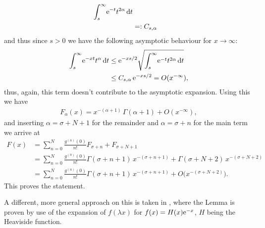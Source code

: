 \begin{Theorem}
\begin{Proof}
\begin{align*}
      \Integ[\infty]{s}{t}{\Eto{-t}t^{2\alpha}} \\
      &=: C_{s,\alpha}
    \end{align*}
    and thus since $s>0$ we have the following asymptotic behaviour for
    $x\to\infty$:
    \begin{align*}
      \Integ[\infty]{s}{t}{\Eto{-xt}t^\alpha} &\le \Eto{-xs/2}
      \sqrt{\Integ[\infty]{s}{t}{\Eto{-t}t^{2\alpha}}} \\
      &\le C_{s,\alpha}\,\Eto{-xs/2} = O(x^{-\infty}),
    \end{align*}
    thus, again, this term doesn't contribute to the asymptotic expansion. Using
    this we have
    \begin{align*}
      F_\alpha(x) = x^{-(\alpha+1)}\,\Gamma(\alpha + 1) + O(x^{-\infty}),
    \end{align*}
    and inserting $\alpha = \sigma + N + 1$ for the remainder and $\alpha =
    \sigma + n$ for the main term we arrive at
    \begin{align*}
      F(x) &= \sum_{n=0}^N \frac{g^{(n)}(0)}{n!} F_{\sigma+n}
            + F_{\sigma + N + 1} \\
           &= \sum_{n=0}^N \frac{g^{(n)}(0)}{n!}
            \Gamma(\sigma + n +1)\,x^{-(\sigma + n + 1)} + \Gamma(\sigma +
              N + 2)\,x^{-(\sigma + N + 2)} \\
           &= \sum_{n=0}^N \frac{g^{(n)}(0)}{n!}\Gamma(\sigma + n +
            1)\,x^{-(\sigma + n + 1)} + O\bigl(x^{-(\sigma + N + 2)}\bigr).
    \end{align*}
    This proves the statement.
  \end{Proof}
  \begin{Remark}
    A different, more general approach on this is taken in \cite[Example 53,
    p104]{Estrada1993}, where the Lemma is proven by use of the expansion of
    $f(\lambda x)$ for $f(x) = H(x)\Eto{-x}$, $H$ being the Heaviside function.
  \end{Remark}
\end{Theorem}
